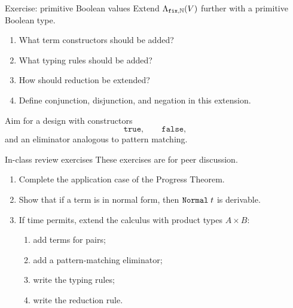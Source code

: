 \begin{frame}{Exercise: primitive Boolean values}
  Extend $\Lambda_{\mathtt{fix},\mathbb{N}}(V)$ further with a primitive Boolean type.

  \begin{enumerate}
    \item What term constructors should be added?
    \item What typing rules should be added?
    \item How should reduction be extended?
    \item Define conjunction, disjunction, and negation in this extension.
  \end{enumerate}

  \vfill

  Aim for a design with constructors
  \[
    \mathtt{true},
    \qquad
    \mathtt{false},
  \]
  and an eliminator analogous to pattern matching.
\end{frame}

\begin{frame}{In-class review exercises}
  These exercises are for peer discussion.

  \begin{enumerate}
    \item Complete the application case of the Progress Theorem.

    \item Show that if a term is in normal form, then $\mathtt{Normal}\;t$ is derivable.

    \item If time permits, extend the calculus with product types $A \times B$:
      \begin{enumerate}
        \item add terms for pairs;
        \item add a pattern-matching eliminator;
        \item write the typing rules;
        \item write the reduction rule.
      \end{enumerate}
  \end{enumerate}
\end{frame}

%  
%  

\appendix


